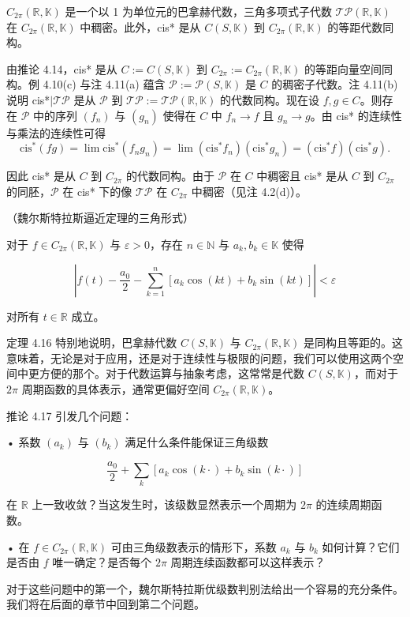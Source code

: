 \begin{theorem}

$C_{2\pi}(\mathbb{R},\mathbb{K})$ 是一个以 1 为单位元的巴拿赫代数，三角多项式子代数 $\mathcal{TP}(\mathbb{R},\mathbb{K})$ 在 $C_{2\pi}(\mathbb{R},\mathbb{K})$ 中稠密。此外，cis* 是从 $C(S,\mathbb{K})$ 到 $C_{2\pi}(\mathbb{R},\mathbb{K})$ 的等距代数同构。

\proofhead
由推论 4.14，cis* 是从 $C:=C(S,\mathbb{K})$ 到 $C_{2\pi}:=C_{2\pi}(\mathbb{R},\mathbb{K})$ 的等距向量空间同构。例 4.10(c) 与注 4.11(a) 蕴含 $\mathcal{P}:=\mathcal{P}(S,\mathbb{K})$ 是 $C$ 的稠密子代数。注 4.11(b) 说明 cis*$|\mathcal{T}\mathcal{P}$ 是从 $\mathcal{P}$ 到 $\mathcal{T}\mathcal{P}:=\mathcal{T}\mathcal{P}(\mathbb{R},\mathbb{K})$ 的代数同构。现在设 $f,g\in C$。则存在 $\mathcal{P}$ 中的序列 $(f_n)$ 与 $(g_n)$ 使得在 $C$ 中 $f_n\to f$ 且 $g_n\to g$。由 cis* 的连续性与乘法的连续性可得
\[
\mathrm{c i s}^{*}(f g)=\lim\mathrm{c i s}^{*}(f_{n}g_{n})=\lim(\mathrm{c i s}^{*}f_{n})(\mathrm{c i s}^{*}g_{n})=(\mathrm{c i s}^{*}f)(\mathrm{c i s}^{*}g).
\]

因此 cis* 是从 $C$ 到 $C_{2\pi}$ 的代数同构。由于 $\mathcal{P}$ 在 $C$ 中稠密且 cis* 是从 $C$ 到 $C_{2\pi}$ 的同胚，$\mathcal{P}$ 在 cis* 下的像 $\mathcal{TP}$ 在 $C_{2\pi}$ 中稠密（见注 4.2(d)）。

\end{theorem}

\begin{corollary}

（魏尔斯特拉斯逼近定理的三角形式）

对于  $f \in C_{2\pi}(\mathbb{R}, \mathbb{K})$ 与  $\varepsilon > 0$，存在  $n \in \mathbb{N}$ 与  $a_k, b_k \in \mathbb{K}$ 使得

\[
\left|f(t)-\frac{a_{0}}{2}-\sum_{k=1}^{n}\left[a_{k}\cos(k t)+b_{k}\sin(k t)\right]\right|<\varepsilon
\]

对所有  $t \in \mathbb{R}$ 成立。

定理 4.16 特别地说明，巴拿赫代数  $C(S, \mathbb{K})$ 与  $C_{2\pi}(\mathbb{R}, \mathbb{K})$ 是同构且等距的。这意味着，无论是对于应用，还是对于连续性与极限的问题，我们可以使用这两个空间中更方便的那个。对于代数运算与抽象考虑，这常常是代数  $C(S, \mathbb{K})$，而对于  $2\pi$ 周期函数的具体表示，通常更偏好空间  $C_{2\pi}(\mathbb{R}, \mathbb{K})$。

推论 4.17 引发几个问题：

• 系数 $(a_{k})$ 与 $(b_{k})$ 满足什么条件能保证三角级数

\begin{equation}
\frac{a_{0}}{2}+\sum_{k}\left[a_{k}\cos(k\cdot)+b_{k}\sin(k\cdot)\right]
\end{equation}

在  $\mathbb{R}$ 上一致收敛？当这发生时，该级数显然表示一个周期为  $2\pi$ 的连续周期函数。

• 在  $f \in C_{2\pi}(\mathbb{R}, \mathbb{K})$ 可由三角级数表示的情形下，系数  $a_k$ 与  $b_k$ 如何计算？它们是否由  $f$ 唯一确定？是否每个  $2\pi$ 周期连续函数都可以这样表示？

对于这些问题中的第一个，魏尔斯特拉斯优级数判别法给出一个容易的充分条件。我们将在后面的章节中回到第二个问题。

\end{corollary}

